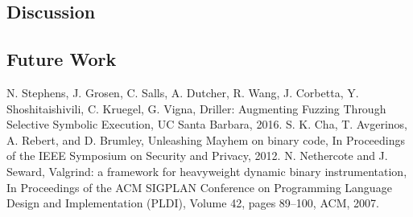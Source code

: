\documentclass[a4paper]{article}
\begin{document}
\subsection{Discussion}
\subsection{Future Work}
\begin{thebibliography}{9}
	N. Stephens, J. Grosen, C. Salls, A. Dutcher, R. Wang, J. Corbetta, Y. Shoshitaishivili, C. Kruegel, G.  Vigna,
	Driller: Augmenting Fuzzing Through Selective Symbolic Execution,
	UC Santa Barbara,
	2016.
	S. K. Cha, T. Avgerinos, A. Rebert, and D. Brumley,
	Unleashing Mayhem on binary code,
	In Proceedings of the IEEE Symposium on Security and Privacy,
	2012.
	N. Nethercote and J. Seward,
	Valgrind: a framework for heavyweight dynamic binary instrumentation, 
	In Proceedings of the ACM SIGPLAN Conference on Programming Language Design and Implementation (PLDI),
	Volume 42,
	pages 89–100, 
	ACM,
	2007.
\end{thebibliography}

\end{document}
